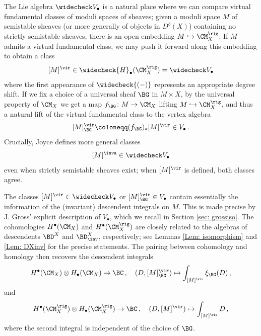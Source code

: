 The Lie algebra $\widecheck V_\bullet$ is a natural place where we can compare virtual fundamental classes of moduli spaces of sheaves; given a moduli space $M$ of semistable sheaves (or more generally of objects in $D^b(X)$) containing no strictly semistable sheaves, there is an open embedding $M\hookrightarrow \CM_X^\rig$. If $M$ admits a virtual fundamental class, we may push it forward along this embedding to obtain a class
\[[M]^\vir\in \widecheck{H}_\bullet(\CM_X^\rig)=\widecheck V_\bullet\]
where the first appearance of $\widecheck{(-)}$ represents an appropriate degree shift. If we fix a choice of a universal sheaf $\BG$ in $M\times X$, by the universal property of $\CM_X$ we get a map $f_\BG\colon M\to \CM_X$ lifting $M\hookrightarrow \CM_X^\rig$, and thus a natural lift of the virtual fundamental class to the vertex algebra
\[[M]^{\vir}_{\BG}\coloneqq (f_\BG)_\ast [M]^\vir\in V_\bullet\,.\]
Crucially, Joyce defines more general classes
\[[M]^\inva\in \widecheck V_\bullet\]
even when strictly semistable sheaves exist; when $[M]^\vir$ is defined, both classes agree.

The classes $[M]^\vir\in \widecheck V_\bullet$ or $[M]^{\vir}_{\BG}\in V_\bullet$ contain essentially the information of the (invariant) descendent integrals on $M$. This is made precise by J. Gross' \cite{Gr19} explicit description of $V_\bullet$, which we recall in Section \ref{sec: grossiso}. The cohomologies $H^\bullet(\CM_X)$ and $H^\bullet(\CM_X^\rig)$ are closely related to the algebras of descendents $\BD^X$ and $\BD^X_{\inv}$, respectively; see Lemmas \ref{Lem: isomorphism} and \ref{Lem: DXinv} for the precise statements. The pairing between cohomology and homology then recovers the descendent integrals
$$H^\bullet(\CM_X)\otimes H_\bullet(\CM_X)\to \BC
\,,\quad (D,[M]^{\vir}_{\BG})\mapsto \int_{[M]^\vir}\xi_{\BG}(D)\,,
$$
and
$$H^\bullet(\CM_X^\rig)\otimes H_\bullet(\CM_X^\rig)\to \BC\,,\quad
(D,[M]^\vir)\mapsto \int_{[M]^\vir}D \,,
$$
where the second integral is independent of the choice of $\BG$.




